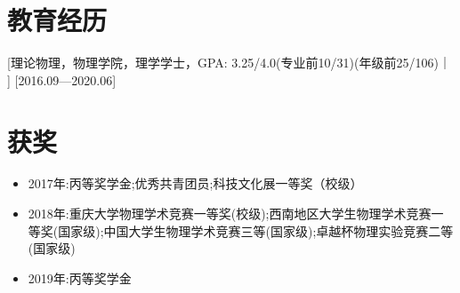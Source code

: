 \documentclass{resume}
\begin{document}


\ResumeTitle

\section{教育经历}
[\textnormal{理论物理，物理学院，理学学士，GPA: 3.25/4.0\small{(专业前10/31)(年级前25/106)}}｜ ]   [2016.09—2020.06] 


\section{获奖}
\begin{itemize}
  \item 2017年:丙等奖学金;优秀共青团员;科技文化展一等奖（校级）
  \item 2018年:重庆大学物理学术竞赛一等奖(校级);西南地区大学生物理学术竞赛一等奖(国家级);中国大学生物理学术竞赛三等(国家级);卓越杯物理实验竞赛二等(国家级)
  \item 2019年:丙等奖学金
\end{itemize}
\end{document}
